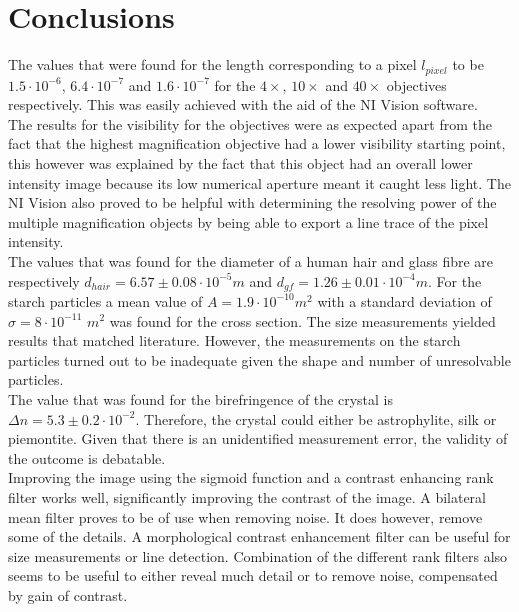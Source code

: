 \section{Conclusions}

The values that were found  for the length corresponding to a pixel $l_{pixel}$ to be $1.5\cdot10^{-6}$, $6.4\cdot10^{-7}$ and $1.6\cdot10^{-7}$ for the $4\times$, $10\times$ and $40\times$ objectives respectively. This was easily achieved with the aid of the NI Vision software.\\
The results for the visibility for the objectives were as expected apart from the fact that the highest magnification objective had a lower visibility starting point, this however was explained by the fact that this object had an overall lower intensity image because its low numerical aperture meant it caught less light. The NI Vision also proved to be helpful with determining the resolving power of the multiple magnification objects by being able to export a line trace of the pixel intensity.\\
The values that was found for the diameter of a human hair and glass fibre are respectively $d_{hair}=6.57\pm0.08\cdot10^{-5} m$ and $d_{gf}=1.26\pm0.01\cdot10^{-4} m$. For the starch particles a mean  value of $A=1.9\cdot10^{-10} m^2$ with a standard deviation of $\sigma = 8 \cdot10^{-11}$ $m^2$ was found for the cross section. The size measurements yielded results that matched literature. However, the measurements on the starch particles turned out to be inadequate given the shape and number of unresolvable particles.\\
The value that was found for the birefringence of the crystal is $\Delta n = 5.3\pm0.2\cdot10^{-2}$. Therefore, the crystal could either be astrophylite, silk or piemontite. Given that there is an unidentified measurement error, the validity of the outcome is debatable.\\
Improving the image using the sigmoid function and a contrast enhancing rank filter works well, significantly improving the contrast of the image. A bilateral mean filter proves to be of use when removing noise. It does however, remove some of the details. A morphological contrast enhancement filter can be useful for size measurements or line detection. Combination of the different rank filters also seems to be useful to either reveal much detail or to remove noise, compensated by gain of contrast.  \\


